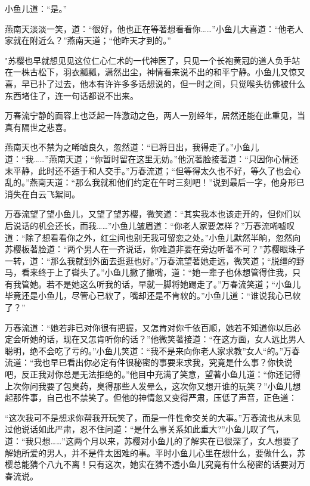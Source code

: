 \documentclass[12pt,oneside]{book}
\begin{document}
小鱼儿道：``是。''

燕南天淡淡一笑，道：``很好，他也正在等著想看看你\ldots\ldots{}''小鱼儿大喜道：``他老人家就在附近么？''燕南天道；``他昨天才到的。''

"苏樱也早就想见见这位仁心仁术的一代神医了，只见一个长袍黄冠的道人负手站在一株古松下，羽衣瓢瓢，潇然出尘，神情看来说不出的和平宁静。小鱼儿又惊又喜，早已扑了过去，他本有许许多多话想说的，但一时之间，只觉喉头彷佛被什么东西堵住了，连一句话都说不出来。

万春流宁静的面容上也泛起一阵激动之色，两人一别经年，居然还能在此重见，当真有隔世之悲喜。

燕南天也不禁为之唏嘘良久，忽然道：``已将日出，我得走了。''小鱼儿道：``我\ldots\ldots{}''燕南天道；``你暂时留在这里无妨。''他沉著脸接著道：``只因你心情还末平静，此时还不适于和人交手。''万春流道；``但等得太久也不好，等久了也会心乱的。''燕南天道：``那么我就和他们约定在午时三刻吧！''说到最后一字，他身形已消失在白云飞絮间。

万春流望了望小鱼儿，又望了望苏樱，微笑道：``其实我本也该走开的，但你们以后说话的机会还长，而我\ldots\ldots{}''小鱼儿皱眉道：``你老人家要怎样？''万春流唏嘘叹道：``除了想看看你之外，红尘间也别无我可留恋之处。''小鱼儿默然半晌，忽然向苏樱板著脸道：``两个男人在一齐说话，你难道非要在旁边听著不可？''苏樱眼珠子一转，道：``那么我就到外面去逛逛也好。''万春流望著她走远，微笑道；``脱缰的野马，看来终于上了辔头了。''小鱼儿撇了撇嘴，道：``她一辈子也休想管得住我，只有我管她。若不是她这么听我的话，早就一脚将她踢走了。''万春流笑道；``小鱼儿毕竟还是小鱼儿，尽管心已软了，嘴却还是不肯软的。''小鱼儿道：``谁说我心已软了？''

万春流道：``她若非已对你很有把握，又怎肯对你千依百顺，她若不知道你以后必定会听她的话，现在又怎肯听你的话？''他微笑著接道：``在这方面，女人远比男人聪明，绝不会吃了亏的。''小鱼儿笑道：``我不是来向你老人家求教''女人``的。''万春流道：``我也早已看出你必定有件很秘密的事要来求我，究竟是什么事？你快说吧，反正我对你总是无法拒绝的。''他目中充满了笑意，望著小鱼儿道：``你还记得上次你问我要了包臭药，臭得那些人发晕么，这次你又想开谁的玩笑？''小鱼儿想起那件事，自己也不禁笑了。但他的神情忽又变得严肃，压低了声音，正色道：

``这次我可不是想求你帮我开玩笑了，而是一件性命交关的大事。''万春流也从末见过他说话如此严肃，忍不住问道：``是什么事关系如此重大?''小鱼儿叹了气，道：``我只想\ldots\ldots{}''这两个月以来，苏樱对小鱼儿的了解实在已很深了，女人想要了解她所爱的男人，并不是件太困难的事。平时小鱼儿心里在想什么，要做什么，苏樱总能猜个八九不离！只有这次，她实在猜不透小鱼儿究竟有什么秘密的话要对万春流说。
\end{document}
